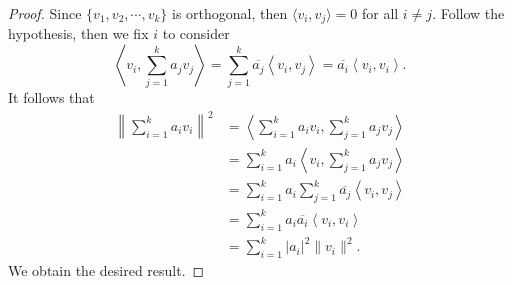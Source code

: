 \begin{Exercise}
	\begin{proof}
		Since $\{v_1, v_2, \cdots, v_k\}$ is orthogonal, then $\langle v_i, v_j \rangle = 0$ for all $i\neq j$. Follow the hypothesis, then we fix $i$ to consider 
		$$
		\left\langle v_i, \sum_{j=1}^{k} a_j v_j \right\rangle
		= \sum_{j=1}^{k} \overline{a_j} \left\langle v_i, v_j \right\rangle
		= \overline{a_i}\left\langle v_i, v_i \right\rangle.
		$$
		It follows that
		\begin{align*}
		\left\| \sum_{i=1}^{k} a_i v_i \right\|^2
		&= \left\langle \sum_{i=1}^{k} a_i v_i, \sum_{j=1}^{k} a_j v_j \right\rangle \\
		&= \sum_{i=1}^{k} a_i \left\langle v_i, \sum_{j=1}^{k} a_j v_j \right\rangle \\
		&= \sum_{i=1}^{k} a_i \sum_{j=1}^{k} \overline{a_j} \left\langle v_i, v_j \right\rangle \\
		&= \sum_{i=1}^{k} a_i \overline{a_i} \left\langle v_i, v_i \right\rangle \\
		&= \sum_{i=1}^{k} |a_i|^2 \| v_i \|^2.
		\end{align*}
		We obtain the desired result.
	\end{proof}
\end{Exercise}